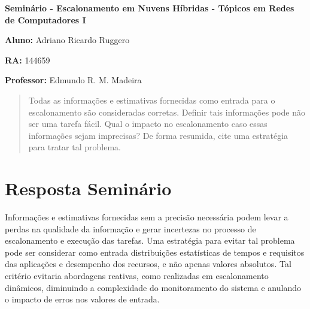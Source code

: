 \documentclass[12pt,twoside,a4paper]{article}
\begin{document}
\vskip 15mm

\begin{center} 
\textbf{Seminário  - Escalonamento em Nuvens Híbridas - Tópicos em Redes de Computadores I}

\end{center}

\vskip 5mm

\textbf{Aluno:} Adriano Ricardo Ruggero

\textbf{RA:} 144659

\textbf{Professor:} Edmundo R. M. Madeira

\vskip 20mm

\begin{abstract}

Todas as informações e estimativas fornecidas como entrada
para o escalonamento são consideradas corretas. Definir tais
informações pode não ser uma tarefa fácil.
Qual o impacto no escalonamento caso essas informações
sejam imprecisas? De forma resumida, cite uma estratégia para
tratar tal problema.


\end{abstract}

\newpage
\pagestyle{plain}
\headheight 0.0cm
\headsep 0.0cm
\footskip 2.2cm

\section{Resposta Seminário}
\label{sec:01}

Informações e estimativas fornecidas sem a precisão necessária podem levar a perdas na qualidade da informação e gerar incertezas no processo de escalonamento e execução das tarefas. 
Uma estratégia para evitar tal problema pode ser considerar como entrada distribuições estatísticas de tempos e requisitos das aplicações e desempenho dos recursos, e não apenas valores absolutos. Tal critério evitaria abordagens reativas, como realizadas em escalonamento dinâmicos, diminuindo a complexidade do monitoramento do sistema e anulando o impacto de erros nos valores de entrada\cite{Escalonamento}.



\end{document}
